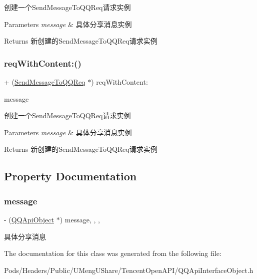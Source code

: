 创建一个\+Send\+Message\+To\+Q\+Q\+Req请求实例 
\begin{DoxyParams}{Parameters}
{\em message} & 具体分享消息实例 \\
\hline
\end{DoxyParams}
\begin{DoxyReturn}{Returns}
新创建的\+Send\+Message\+To\+Q\+Q\+Req请求实例 
\end{DoxyReturn}
\mbox{\label{interface_send_message_to_q_q_req_ac68151badf97161084f0c139046065c6}} 
\subsubsection{\texorpdfstring{req\+With\+Content\+:()}{reqWithContent:()}\hspace{0.1cm}{\footnotesize\ttfamily [2/2]}}
{\footnotesize\ttfamily + (\mbox{\hyperlink{interface_send_message_to_q_q_req}{Send\+Message\+To\+Q\+Q\+Req}} $\ast$) req\+With\+Content\+: \begin{DoxyParamCaption}\item[{(\mbox{\hyperlink{interface_q_q_api_object}{Q\+Q\+Api\+Object}} $\ast$)}]{message }\end{DoxyParamCaption}}

创建一个\+Send\+Message\+To\+Q\+Q\+Req请求实例 
\begin{DoxyParams}{Parameters}
{\em message} & 具体分享消息实例 \\
\hline
\end{DoxyParams}
\begin{DoxyReturn}{Returns}
新创建的\+Send\+Message\+To\+Q\+Q\+Req请求实例 
\end{DoxyReturn}


\subsection{Property Documentation}
\mbox{\label{interface_send_message_to_q_q_req_abc994246c5c76b9c3333f656400d933c}} 
\subsubsection{\texorpdfstring{message}{message}}
{\footnotesize\ttfamily -\/ (\mbox{\hyperlink{interface_q_q_api_object}{Q\+Q\+Api\+Object}} $\ast$) message\hspace{0.3cm}{\ttfamily [read]}, {\ttfamily [write]}, {\ttfamily [nonatomic]}, {\ttfamily [retain]}}

具体分享消息 

The documentation for this class was generated from the following file\+:\begin{DoxyCompactItemize}
\item 
Pods/\+Headers/\+Public/\+U\+Meng\+U\+Share/\+Tencent\+Open\+A\+P\+I/Q\+Q\+Api\+Interface\+Object.\+h\end{DoxyCompactItemize}
